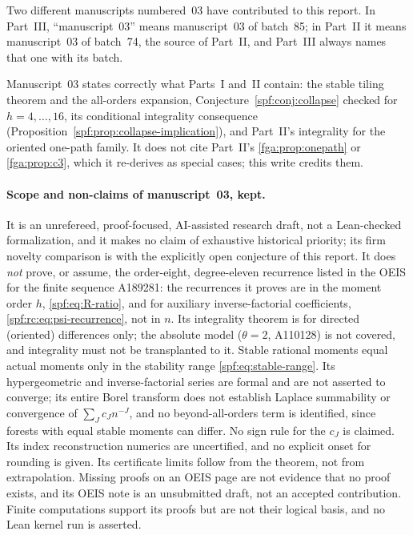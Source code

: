 \documentclass[11pt]{article}
\numberwithin{equation}{section}
\theoremstyle{definition}
\theoremstyle{remark}
\theoremstyle{definition}
\begin{document}
Two different manuscripts numbered~03 have contributed to this report. In
Part~III, ``manuscript~03'' means manuscript~03 of batch~85; in Part~II it
means manuscript~03 of batch~74, the source of Part~II, and Part~III always
names that one with its batch.

Manuscript~03 states correctly what Parts~I and~II contain: the stable
tiling theorem and the all-orders expansion, Conjecture~\ref{spf:conj:collapse}
checked for $h=4,\ldots,16$, its conditional integrality consequence
(Proposition~\ref{spf:prop:collapse-implication}), and Part~II's integrality
for the oriented one-path family. It does not cite Part~II's
\cref{fga:prop:onepath} or \cref{fga:prop:c3}, which it re-derives as special
cases; this write credits them.

\paragraph{Scope and non-claims of manuscript~03, kept.}
It is an unrefereed, proof-focused, AI-assisted research draft, not a
Lean-checked formalization, and it makes no claim of exhaustive historical
priority; its firm novelty comparison is with the explicitly open
conjecture of this report. It does \emph{not} prove, or assume, the
order-eight, degree-eleven recurrence listed in the OEIS for the finite
sequence A189281: the recurrences it proves are in the moment order $h$,
\eqref{spf:eq:R-ratio}, and for auxiliary inverse-factorial coefficients,
\eqref{spf:rc:eq:psi-recurrence}, not in $n$. Its integrality theorem is
for directed (oriented) differences only; the absolute model ($\theta=2$,
A110128) is not covered, and integrality must not be transplanted to it.
Stable rational moments equal actual moments only in the stability range
\eqref{spf:eq:stable-range}. Its hypergeometric and inverse-factorial series
are formal and are not asserted to converge; its entire Borel transform does
not establish Laplace summability or convergence of $\sum_Jc_Jn^{-J}$, and no
beyond-all-orders term is identified, since forests with equal stable
moments can differ. No sign rule for the $c_J$ is claimed. Its index
reconstruction numerics are uncertified, and no explicit onset for rounding
is given. Its certificate limits follow from the theorem, not from
extrapolation. Missing proofs on an OEIS page are not evidence that no proof
exists, and its OEIS note is an unsubmitted draft, not an accepted
contribution. Finite computations support its proofs but are not their
logical basis, and no Lean kernel run is asserted.
\end{document}
